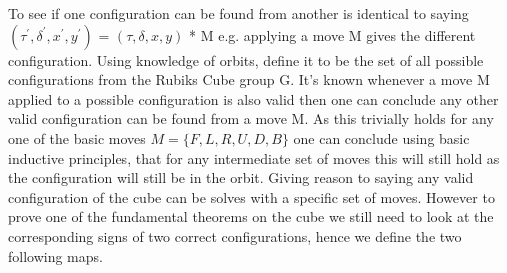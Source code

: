 \documentclass{article}
\begin{document}

To see if one configuration can be found from another is identical to saying $(\tau^{'} ,\delta^{'} , x^{'} , y^{'} )$ = $(\tau,\delta, x, y)$ * M e.g. applying a move M gives the different configuration. Using knowledge of orbits, define it to be the set of all possible configurations from the Rubiks Cube group G. It's known whenever a move M applied to a possible configuration is also valid then one can conclude any other valid configuration can be found from a move M. As this trivially holds for any one of the basic moves $M= \{{F,L,R,U,D,B}\}$ one can conclude using basic inductive principles, that for any intermediate set of moves this will still hold as the configuration will still be in the orbit. Giving reason to saying any valid configuration of the cube can be solves with a specific set of moves. However to prove one of the fundamental theorems on the cube we still need to look at the corresponding signs of two correct configurations, hence we define the two following maps. 
\end{document}
